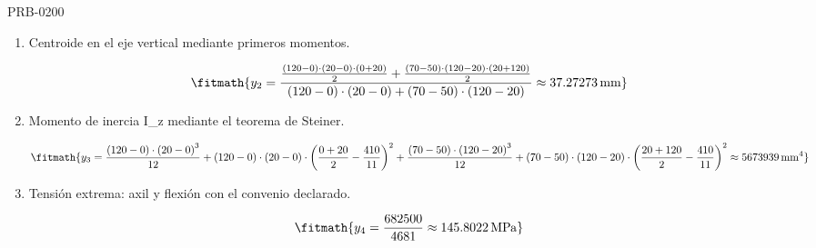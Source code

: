 \begin{studiumworked}{PRB-0200}
\begin{enumerate}
\item Centroide en el eje vertical mediante primeros momentos.

\[\fitmath{y_{2}=\frac{\frac{\left(120-0\right)\cdot \left(20-0\right)\cdot \left(0+20\right)}{2}+\frac{\left(70-50\right)\cdot \left(120-20\right)\cdot \left(20+120\right)}{2}}{\left(120-0\right)\cdot \left(20-0\right)+\left(70-50\right)\cdot \left(120-20\right)}\approx 37.27273\,\mathrm{mm}}\]

\item Momento de inercia I\_z mediante el teorema de Steiner.

\[\fitmath{y_{3}=\frac{\left(120-0\right)\cdot {\left(20-0\right)}^{3}}{12}+\left(120-0\right)\cdot \left(20-0\right)\cdot {\left(\frac{0+20}{2}-\frac{410}{11}\right)}^{2}+\frac{\left(70-50\right)\cdot {\left(120-20\right)}^{3}}{12}+\left(70-50\right)\cdot \left(120-20\right)\cdot {\left(\frac{20+120}{2}-\frac{410}{11}\right)}^{2}\approx 5673939\,\mathrm{mm^{4}}}\]

\item Tensión extrema: axil y flexión con el convenio declarado.

\[\fitmath{y_{4}=\frac{682500}{4681}\approx 145.8022\,\mathrm{MPa}}\]

\end{enumerate}


\end{studiumworked}

